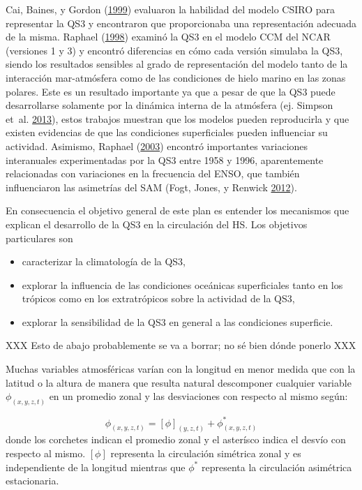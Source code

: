 \documentclass[spanish,a4paper,12p]{book}
\providecommand{\tightlist}{%
  \setlength{\itemsep}{0pt}\setlength{\parskip}{0pt}}
\begin{document}
Cai, Baines, y Gordon (\protect\hyperlink{ref-Cai1999}{1999}) evaluaron
la habilidad del modelo CSIRO para representar la QS3 y encontraron que
proporcionaba una representación adecuada de la misma. Raphael
(\protect\hyperlink{ref-Raphael1998}{1998}) examinó la QS3 en el modelo
CCM del NCAR (versiones 1 y 3) y encontró diferencias en cómo cada
versión simulaba la QS3, siendo los resultados sensibles al grado de
representación del modelo tanto de la interacción mar-atmósfera como de
las condiciones de hielo marino en las zonas polares. Este es un
resultado importante ya que a pesar de que la QS3 puede desarrollarse
solamente por la dinámica interna de la atmósfera (ej. Simpson et~al.
\protect\hyperlink{ref-Simpson2013}{2013}), estos trabajos muestran que
los modelos pueden reproducirla y que existen evidencias de que las
condiciones superficiales pueden influenciar su actividad. Asimismo,
Raphael (\protect\hyperlink{ref-Raphael2003}{2003}) encontró importantes
variaciones interanuales experimentadas por la QS3 entre 1958 y 1996,
aparentemente relacionadas con variaciones en la frecuencia del ENSO,
que también influenciaron las asimetrías del SAM (Fogt, Jones, y Renwick
\protect\hyperlink{ref-Fogt2012}{2012}).

En consecuencia el objetivo general de este plan es entender los
mecanismos que explican el desarrollo de la QS3 en la circulación del
HS. Los objetivos particulares son

\begin{itemize}
\tightlist
\item
  caracterizar la climatología de la QS3,
\item
  explorar la influencia de las condiciones oceánicas superficiales
  tanto en los trópicos como en los extratrópicos sobre la actividad de
  la QS3,
\item
  explorar la sensibilidad de la QS3 en general a las condiciones
  superficie.
\end{itemize}

XXX Esto de abajo probablemente se va a borrar; no sé bien dónde ponerlo
XXX

Muchas variables atmosféricas varían con la longitud en menor medida que
con la latitud o la altura de manera que resulta natural descomponer
cualquier variable \(\phi_{(x, y, z, t)}\) en un promedio zonal y las
desviaciones con respecto al mismo según:

\[
\phi_{(x, y, z, t)} = [\phi]_{(y, z, t)} + \phi_{(x, y, z, t)}^*
\] donde los corchetes indican el promedio zonal y el asterísco indica
el desvío con respecto al mismo. \([\phi]\) representa la circulación
simétrica zonal y es independiente de la longitud mientras que
\(\phi^*\) representa la circulación asimétrica estacionaria.
\end{document}
